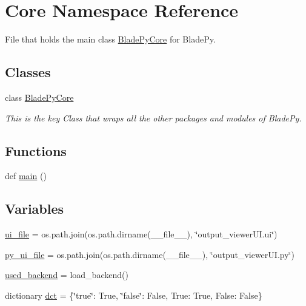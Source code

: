 \hypertarget{namespace_core}{}\section{Core Namespace Reference}
\label{namespace_core}


File that holds the main class \hyperlink{class_core_1_1_blade_py_core}{Blade\+Py\+Core} for Blade\+Py.  


\subsection*{Classes}
\begin{DoxyCompactItemize}
\item 
class \hyperlink{class_core_1_1_blade_py_core}{Blade\+Py\+Core}
\begin{DoxyCompactList}\small\item\em This is the key Class that wraps all the other packages and modules of Blade\+Py. \end{DoxyCompactList}\end{DoxyCompactItemize}
\subsection*{Functions}
\begin{DoxyCompactItemize}
\item 
def \hyperlink{namespace_core_abbe2fb717a0d4efddde9090f186bd64b}{main} ()
\end{DoxyCompactItemize}
\subsection*{Variables}
\begin{DoxyCompactItemize}
\item 
\hyperlink{namespace_core_a1363a763ded79810023c205b7ed824f0}{ui\+\_\+file} = os.\+path.\+join(os.\+path.\+dirname(\+\_\+\+\_\+file\+\_\+\+\_\+), \char`\"{}output\+\_\+viewer\+U\+I.\+ui\char`\"{})
\item 
\hyperlink{namespace_core_a4cd2f45c63964d86002d7a37c7141973}{py\+\_\+ui\+\_\+file} = os.\+path.\+join(os.\+path.\+dirname(\+\_\+\+\_\+file\+\_\+\+\_\+), \char`\"{}output\+\_\+viewer\+U\+I.\+py\char`\"{})
\item 
\hyperlink{namespace_core_a5233d27f0fe842cb39f926c4360e63dd}{used\+\_\+backend} = load\+\_\+backend()
\item 
dictionary \hyperlink{namespace_core_a929c2310eb32ddd6da7fa2835f7f96d1}{dct} = \{\char`\"{}true\char`\"{}\+: True, \char`\"{}false\char`\"{}\+: False, True\+: True, False\+: False\}
\end{DoxyCompactItemize}


